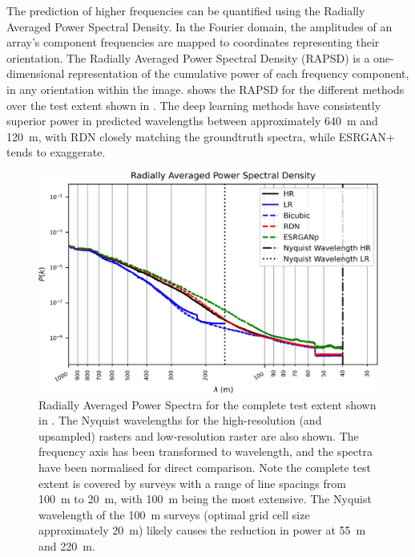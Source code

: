 \documentclass[manuscript.tex]{subfiles}
\begin{document}
The prediction of higher frequencies can be quantified using the Radially Averaged Power Spectral Density.
In the Fourier domain, the amplitudes of an array's component frequencies are mapped to coordinates representing their orientation.
The Radially Averaged Power Spectral Density (RAPSD) \parencite{ulichneyDitheringBlueNoise1988} is a one-dimensional representation of the cumulative power of each frequency component, in any orientation within the image.
 shows the RAPSD for the different methods over the test extent shown in . The deep learning methods have consistently superior power in predicted wavelengths between approximately \qty{640}{\metre} and \qty{120}{\metre}, with RDN\textdaggerdbl{} closely matching the groundtruth spectra, while ESRGAN+ tends to exaggerate.


\begin{figure}[hbt]
    \includegraphics[width=\linewidth]{fig/p1/rapsd.jpg}
    \caption[short]{Radially Averaged Power Spectra for the complete test extent shown in .
        The Nyquist wavelengths for the high-resolution (and upsampled) rasters and low-resolution raster are also shown.
        The frequency axis has been transformed to wavelength, and the spectra have been normalised for direct comparison.
        Note the complete test extent is covered by surveys with a range of line spacings from \qty{100}{\metre} to \qty{20}{\metre}, with \qty{100}{\metre} being the most extensive.
        The Nyquist wavelength of the \qty{100}{\metre} surveys (optimal grid cell size approximately \qty{20}{\metre}) likely causes the reduction in power at \qty{55}{\metre} and \qty{220}{\metre}.
    }
    \label{fig:rapsd}
\end{figure}
\end{document}
